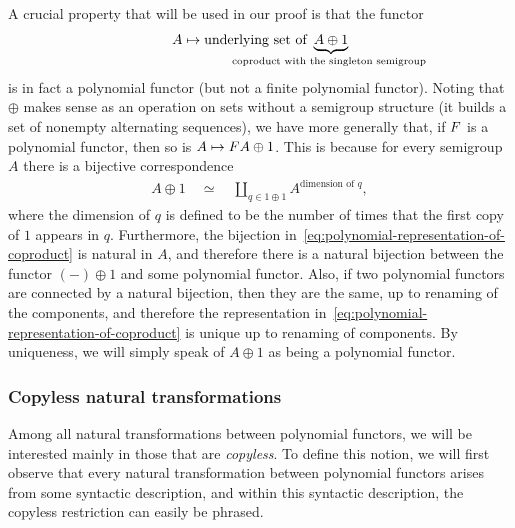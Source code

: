 \begin{example}\label{ex:coproduct-as-polynomial-functor}
    A crucial property that will be used in our proof is that the functor
    \begin{align*}
    A \mapsto \text{underlying set of}\ \myunderbrace{A \oplus 1}{\text{coproduct with the singleton semigroup}}
    \end{align*}
    is in fact a polynomial functor (but not a finite polynomial functor). Noting that $\oplus$ makes sense as an operation on sets without a semigroup structure (it builds a set of nonempty alternating sequences), we have more generally that, if $\functor$ is a polynomial functor, then so is $A \mapsto \functor A \oplus 1$. This is because for every semigroup $A$ there is a bijective correspondence 
    \begin{align}\label{eq:polynomial-representation-of-coproduct}
    A \oplus 1 \quad \simeq \quad \coprod_{q \in 1 \oplus 1} A^{\text{dimension of $q$}},
    \end{align}
    where the dimension of $q$ is defined to be the number of times that the first copy of $1$ appears in $q$. Furthermore, the bijection in~\eqref{eq:polynomial-representation-of-coproduct} is natural in $A$, and therefore there is a natural bijection between the functor $(-) \oplus 1$ and some polynomial functor. Also, if two polynomial functors are connected by a natural bijection, then they are the same, up to renaming of the components, and therefore the representation in~\eqref{eq:polynomial-representation-of-coproduct} is unique up to renaming of components. By uniqueness, we will simply speak of $A \oplus 1$ as being a polynomial functor. 
\end{example}




\subsubsection{Copyless natural transformations}  Among all natural  transformations between polynomial functors, we will be interested mainly in those that are  \emph{copyless}. To define this notion, we will first observe that  every natural transformation between polynomial functors  arises from some syntactic description, and within this syntactic description, the copyless restriction can easily be phrased. 

